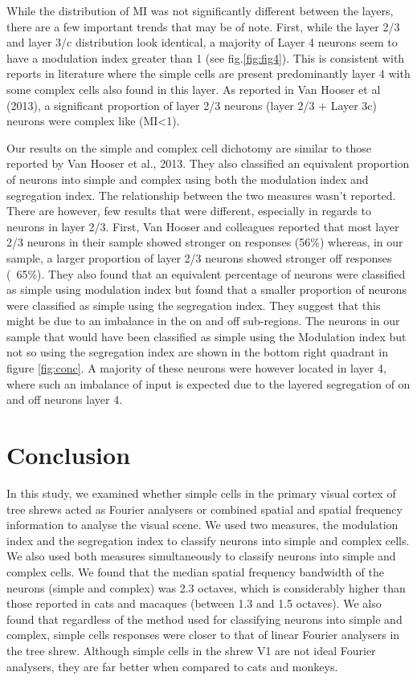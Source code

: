 	While the distribution of MI was not significantly different between the layers, there are a few important trends that may be of note. First, while the layer 2/3 and layer 3/c distribution look identical, a majority of Layer 4 neurons seem to have a modulation index greater than 1 (see fig.\ref{fig:fig4}). This is consistent with reports in literature where the simple cells are present predominantly layer 4 with some complex cells also found in this layer. As reported in Van Hooser et al (2013), a significant proportion of layer 2/3 neurons (layer 2/3 + Layer 3c) neurons were complex like (MI<1).
	
	Our results on the simple and complex cell dichotomy are similar to those reported by Van Hooser et al., 2013. They also classified an equivalent proportion of neurons into simple and complex using both the modulation index and segregation index. The relationship between the two measures wasn't reported. There are however, few results that were different, especially in regards to neurons in layer 2/3. First, Van Hooser and colleagues reported that most layer 2/3 neurons in their sample showed stronger on responses (56\%) whereas, in our sample, a larger proportion of layer 2/3 neurons showed stronger off responses (~65\%). They also found that an equivalent percentage of neurons were classified as simple using modulation index but found that a smaller proportion of neurons were classified as simple using the segregation index. They suggest that this might be due to an imbalance in the on and off sub-regions. The neurons in our sample that would have been classified as simple using the Modulation index but not so using the segregation index are shown in the bottom right quadrant in figure \ref{fig:conc}. A majority of these neurons were however located in layer 4, where such an imbalance of input is expected due to the layered segregation of on and off neurons layer 4.
	
	\pagebreak
	
	\section{Conclusion}
	
	In this study, we examined whether simple cells in the primary visual cortex of tree shrews acted as Fourier analysers or combined spatial and spatial frequency information to analyse the visual scene. We used two measures, the modulation index and the segregation index to classify neurons into simple and complex cells. We also used both measures simultaneously to classify neurons into simple and complex cells. We found that the median spatial frequency bandwidth of the neurons (simple and complex) was 2.3 octaves, which is considerably higher than those reported in cats and macaques (between 1.3 and 1.5 octaves). We also found that regardless of the method used for classifying neurons into simple and complex, simple cells responses were closer to that of linear Fourier analysers in the tree shrew. Although simple cells in the shrew V1 are not ideal Fourier analysers, they are far better when compared to cats and monkeys.